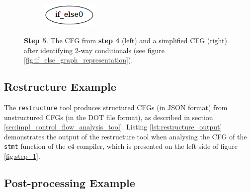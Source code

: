 \begin{figure}[htbp]
\begin{subfigure}[t]{0.45\textwidth}
	\end{subfigure}
	\qquad
	\begin{subfigure}[t]{0.45\textwidth}
		\centering
		\includegraphics[width=0.3\textwidth]{appendices/control_flow_analysis_example/stmt_5.png}
	\end{subfigure}
	\caption{\textbf{Step 5}. The CFG from \textbf{step 4} (left) and a simplified CFG (right) after identifying 2-way conditionals (see figure \ref{fig:if_else_graph_representation}).}
	\label{fig:step_5}
\end{figure}

\clearpage


\subsection{Restructure Example}
\label{app:restructure_example}


The \texttt{restructure} tool produces structured CFGs (in JSON format) from unstructured CFGs (in the DOT file format), as described in section \ref{sec:impl_control_flow_analysis_tool}. Listing \ref{lst:restructure_output} demonstrates the output of the restructure tool when analysing the CFG of the \texttt{stmt} function of the c4 compiler, which is presented on the left side of figure \ref{fig:step_1}.



\clearpage


\subsection{Post-processing Example}


